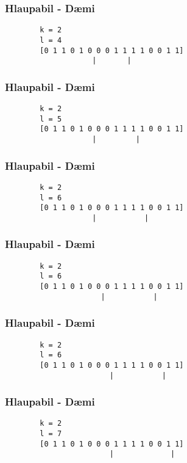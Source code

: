 \documentclass{beamer}
\begin{document}
\begin{frame}[fragile]
	\frametitle{Hlaupabil - Dæmi}
\begin{verbatim}
        k = 2
        l = 4
        [0 1 1 0 1 0 0 0 1 1 1 1 0 0 1 1]
                    |       |
\end{verbatim}
\end{frame}
\addtocounter{framenumber}{-1}

\begin{frame}[fragile]
	\frametitle{Hlaupabil - Dæmi}
\begin{verbatim}
        k = 2
        l = 5
        [0 1 1 0 1 0 0 0 1 1 1 1 0 0 1 1]
                    |         |
\end{verbatim}
\end{frame}
\addtocounter{framenumber}{-1}

\begin{frame}[fragile]
	\frametitle{Hlaupabil - Dæmi}
\begin{verbatim}
        k = 2
        l = 6
        [0 1 1 0 1 0 0 0 1 1 1 1 0 0 1 1]
                    |           |
\end{verbatim}
\end{frame}
\addtocounter{framenumber}{-1}

\begin{frame}[fragile]
	\frametitle{Hlaupabil - Dæmi}
\begin{verbatim}
        k = 2
        l = 6
        [0 1 1 0 1 0 0 0 1 1 1 1 0 0 1 1]
                      |           |
\end{verbatim}
\end{frame}
\addtocounter{framenumber}{-1}

\begin{frame}[fragile]
	\frametitle{Hlaupabil - Dæmi}
\begin{verbatim}
        k = 2
        l = 6
        [0 1 1 0 1 0 0 0 1 1 1 1 0 0 1 1]
                        |           |
\end{verbatim}
\end{frame}
\addtocounter{framenumber}{-1}

\begin{frame}[fragile]
	\frametitle{Hlaupabil - Dæmi}
\begin{verbatim}
        k = 2
        l = 7
        [0 1 1 0 1 0 0 0 1 1 1 1 0 0 1 1]
                        |             |
\end{verbatim}
\end{frame}
\addtocounter{framenumber}{-1}
\end{document}
